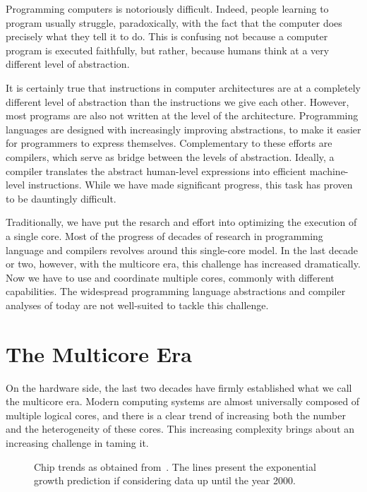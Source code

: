 Programming computers is notoriously difficult.
Indeed, people learning to program usually struggle, paradoxically, with the fact that the computer does precisely what they tell it to do. 
This is confusing not because a computer program is executed faithfully, but rather, because humans think at a very different level of abstraction.

It is certainly true that instructions in computer architectures are at a completely different level of abstraction than the instructions we give each other.
However, most programs are also not written at the level of the architecture.
Programming languages are designed with increasingly improving abstractions, to make it easier for programmers to express themselves.
Complementary to these efforts are compilers, which serve as bridge between the levels of abstraction.
Ideally, a compiler translates the abstract human-level expressions into efficient machine-level instructions.
While we have made significant progress, this task has proven to be dauntingly difficult.

Traditionally, we have put the resarch and effort into optimizing the execution of a single core.
Most of the progress of decades of research in programming language and compilers revolves around this single-core model.
In the last decade or two, however, with the multicore era, this challenge has increased dramatically.
Now we have to use and coordinate multiple cores, commonly with different capabilities.
The widespread programming language abstractions and compiler analyses of today are not well-suited to tackle this challenge.

\section{The Multicore Era}

On the hardware side, the last two decades have firmly established what we call the multicore era.
Modern computing systems are almost universally composed of multiple logical cores, and there is a clear trend of increasing both the number and the heterogeneity of these cores.
This increasing complexity brings about an increasing challenge in taming it.

\begin{figure}[h]
	\centering
   \resizebox{0.9\textwidth}{!}{}
   \caption{Chip trends as obtained from~\cite{microprocessordata}. The lines present the exponential growth prediction if considering data up until the year 2000.}
	\label{fig:multicore_era}
\end{figure}


